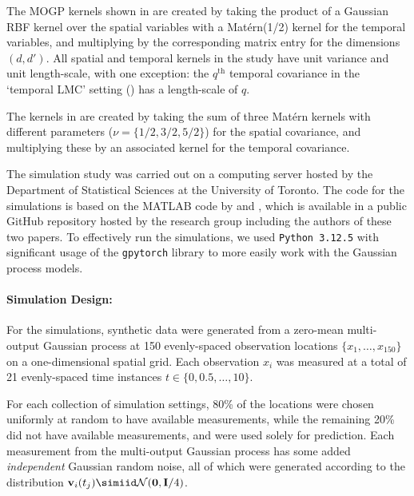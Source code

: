 \documentclass[10pt]{article}
\numberwithin{equation}{section}
\begin{document}
The MOGP kernels shown in  are created by taking the product of a Gaussian RBF kernel over the spatial variables with a Mat{\'e}rn(1/2) kernel for the temporal variables, and multiplying by the corresponding matrix entry for the dimensions $(d, d')$. All spatial and temporal kernels in the study have unit variance and unit length-scale, with one exception: the $q^{\textrm{th}}$ temporal covariance in the `temporal LMC' setting () has a length-scale of $q$.

The kernels in  are created by taking the sum of three Mat{\'e}rn kernels with different parameters ($\nu = \{1/2, 3/2, 5/2\}$) for the spatial covariance, and multiplying these by an associated kernel for the temporal covariance.

The simulation study was carried out on a computing server hosted by the Department of Statistical Sciences at the University of Toronto. The code for the simulations is based on the MATLAB code by \citeauthor{Carron-ML-Kalman-2016} and \citeauthor{Todescato-Efficient-2020}, which is available in a public GitHub repository hosted by the research group including the authors of these two papers. To effectively run the simulations, we used \texttt{Python 3.12.5} \citep{python-3-12-5} with significant usage of the \texttt{gpytorch} \citep{GPyTorch-Library-2018} library to more easily work with the Gaussian process models. 

\paragraph{Simulation Design:} For the simulations, synthetic data were generated from a zero-mean multi-output Gaussian process at 150 evenly-spaced observation locations $\{x_{1}, \dots, x_{150}\}$ on a one-dimensional spatial grid. Each observation $x_{i}$ was measured at a total of 21 evenly-spaced time instances $t \in \{0, 0.5, \dots, 10\}$. 

For each collection of simulation settings, 80\% of the locations were chosen uniformly at random to have available measurements, while the remaining 20\% did not have available measurements, and were used solely for prediction. Each measurement from the multi-output Gaussian process has some added \emph{independent} Gaussian random noise, all of which were generated according to the distribution $\bfv_{i}(t_{j}) \simiid \calN(\mathbf{0}, \bfI/4)$. 
\end{document}
